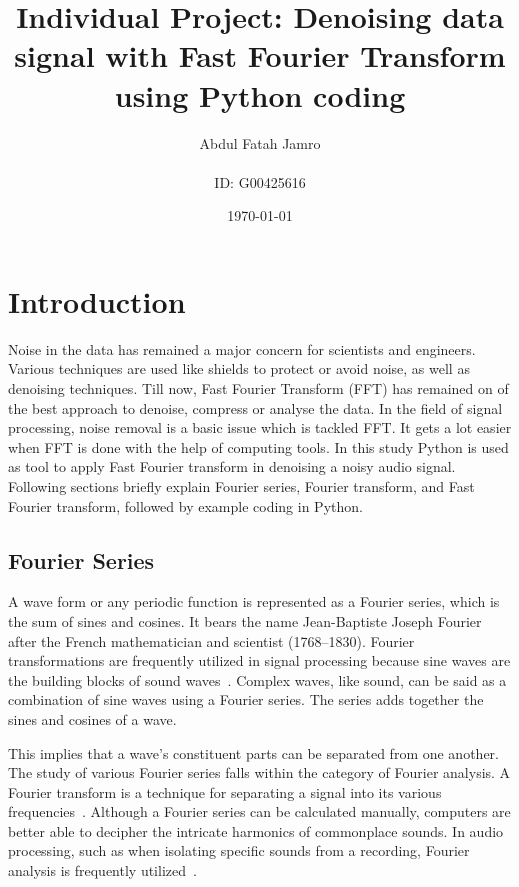 \documentclass[a4paper, 12pt]{scrartcl}
\title{Individual Project: Denoising data signal with Fast Fourier Transform using Python coding}
\author{Abdul Fatah Jamro \\
 \\ID: G00425616}
\date{\today}
\begin{document}
  
\maketitle
 
\tableofcontents

\newpage

\section{Introduction}


Noise in the data has remained a major concern for scientists and engineers.
Various techniques are used like shields to protect or avoid noise, as well as denoising techniques.
Till now, Fast Fourier Transform (FFT) has remained on of the best approach to denoise, compress or analyse the data.
In the field of signal processing, noise removal is a basic issue which is tackled FFT.
It gets a lot easier when FFT is done with the help of computing tools.
In this study Python is used as tool to apply Fast Fourier transform in denoising a noisy audio signal.
Following sections briefly explain Fourier series, Fourier transform, and Fast Fourier transform, followed by example coding in Python. 

\subsection{Fourier Series}
A wave form or any periodic function is represented as a Fourier series, which is the sum of sines and cosines.
It bears the name Jean-Baptiste Joseph Fourier after the French mathematician and scientist (1768--1830).
Fourier transformations are frequently utilized in signal processing because sine waves are the building blocks of sound waves~\cite{tolstov1976fourier}.
Complex waves, like sound, can be said as a combination of sine waves using a Fourier series.
The series adds together the sines and cosines of a wave.

This implies that a wave's constituent parts can be separated from one another.
The study of various Fourier series falls within the category of Fourier analysis.
A Fourier transform is a technique for separating a signal into its various frequencies~\cite{tolstov1976fourier}.
Although a Fourier series can be calculated manually, computers are better able to decipher the intricate harmonics of commonplace sounds.
In audio processing, such as when isolating specific sounds from a recording, Fourier analysis is frequently utilized~\cite{tolstov1976fourier}.
\end{document}
